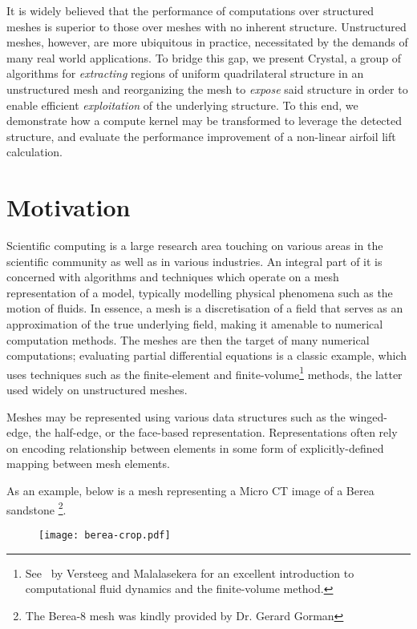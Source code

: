 It is widely believed that the performance of computations over structured meshes is superior to those over meshes with no inherent structure.
Unstructured meshes, however, are more ubiquitous in practice, necessitated by the demands of many real world applications.
To bridge this gap, we present Crystal, a group of algorithms for \emph{extracting} regions of uniform quadrilateral structure in an unstructured mesh and reorganizing the mesh to \emph{expose} said structure in order to enable efficient \emph{exploitation} of the underlying structure.
To this end, we demonstrate how a compute kernel may be transformed to leverage the detected structure, and evaluate the performance improvement of a non-linear airfoil lift calculation.


\section{Motivation}
Scientific computing is a large research area touching on various areas in the scientific community as well as in various industries. An integral part of it is concerned with algorithms and techniques which operate on a mesh representation of a model, typically modelling physical phenomena such as the motion of fluids. In essence, a mesh is a discretisation of a field that serves as an approximation of the true underlying field, making it amenable to numerical computation methods. The meshes are then the target of many numerical computations; evaluating partial differential equations is a classic example, which uses techniques such as the finite-element and finite-volume\footnote{See~\cite{versteeg2007introduction} by Versteeg and Malalasekera for an excellent introduction to computational fluid dynamics and the finite-volume method.} methods, the latter used widely on unstructured meshes.

Meshes may be represented using various data structures such as the winged-edge, the half-edge, or the face-based representation. Representations often rely on encoding relationship between elements in some form of explicitly-defined mapping between mesh elements.

\pagebreak
As an example, below is a mesh representing a Micro CT image of a Berea sandstone \footnote{The Berea-8 mesh was kindly provided by Dr. Gerard Gorman}.


\begin{figure}[H]
\centering
\texttt{[image: berea-crop.pdf]}
\end{figure}

